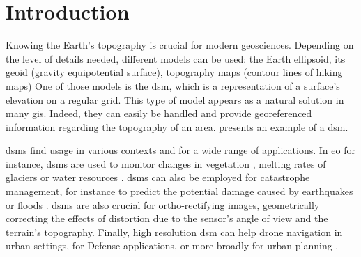 \chapter*{Introduction}
Knowing the Earth's topography is crucial for modern geosciences. Depending on the level of details needed, different models can be used: the Earth ellipsoid, its geoid (gravity equipotential surface), topography maps (\ie contour lines of hiking maps) \etc One of those models is the \acrfull{dsm}, which is a representation of a surface's elevation on a regular grid. This type of model appears as a natural solution in many \acrfull{gis}. Indeed, they can easily be handled and provide georeferenced information regarding the topography of an area.  presents an example of a \acrshort{dsm}.

\acrshort{dsm}s find usage in various contexts and for a wide range of applications. In \acrfull{eo} for instance, \acrshort{dsm}s are used to monitor changes in vegetation \cite{sadeghi_canopy_2016}, melting rates of glaciers \cite{berthier_glacier_2014} or water resources \cite{yamazaki_merit_2019}. \acrshort{dsm}s can also be employed for catastrophe management, for instance to predict the potential damage caused by earthquakes or floods \cite{jenkins_physics-based_2023}. \acrshort{dsm}s are also crucial for ortho-rectifying images, \ie geometrically correcting the effects of distortion due to the sensor's angle of view and the terrain's topography. Finally, high resolution \acrshort{dsm} can help drone navigation in urban settings, for Defense applications, or more broadly for urban planning \cite{velazco_3d_2012}.

